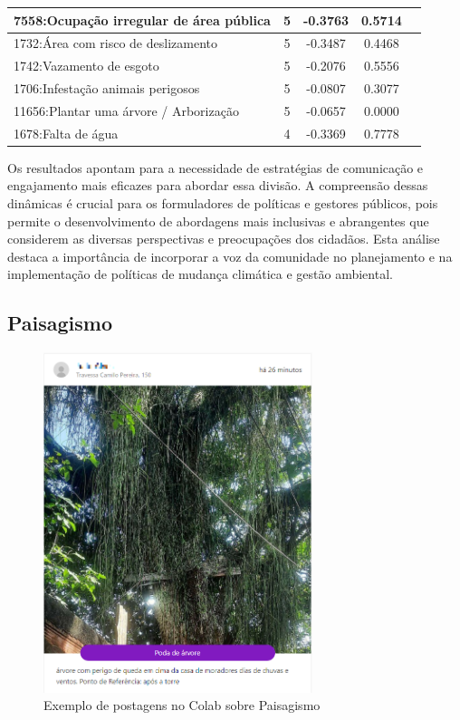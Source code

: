 \begin{table}[htbp]
\begin{tabular}{|l|c|c|c|c|}
		\hline
		7558:Ocupação irregular de área pública         & 5                & -0.3763        & 0.5714           \\
		\hline
		1732:Área com risco de deslizamento             & 5                & -0.3487        & 0.4468           \\
		\hline
		1742:Vazamento de esgoto                        & 5                & -0.2076        & 0.5556           \\
		\hline
		1706:Infestação animais perigosos               & 5                & -0.0807        & 0.3077           \\
		\hline
		11656:Plantar uma árvore / Arborização          & 5                & -0.0657        & 0.0000           \\
		\hline
		1678:Falta de água                              & 4                & -0.3369        & 0.7778           \\
		\hline
	\end{tabular}
\end{table}

Os resultados apontam para a necessidade de estratégias de comunicação e engajamento mais eficazes para abordar essa divisão. A compreensão dessas dinâmicas é crucial para os formuladores de políticas e gestores públicos, pois permite o desenvolvimento de abordagens mais inclusivas e abrangentes que considerem as diversas perspectivas e preocupações dos cidadãos. Esta análise destaca a importância de incorporar a voz da comunidade no planejamento e na implementação de políticas de mudança climática e gestão ambiental.

\subsection{Paisagismo}

\begin{figure}[htb]
	\centering
	\includegraphics[width=0.7\textwidth]{images/colab_posts_paisagismo.png}
	\caption{Exemplo de postagens no Colab sobre Paisagismo}
	\label{fig:colab_posts_paisagismo}
\end{figure}

